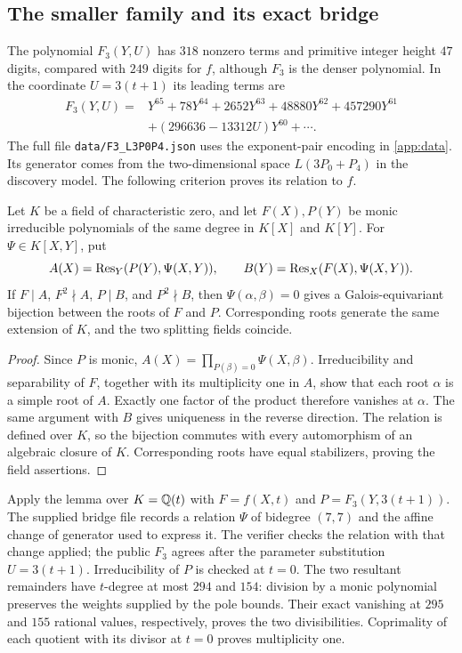 \subsection{The smaller family and its exact bridge}\label{app:smaller}

The polynomial $F_3(Y,U)$ has $318$ nonzero terms and primitive integer
height $47$ digits, compared with $249$ digits for $f$, although $F_3$ is
the denser polynomial. In the coordinate
$U=3(t+1)$ its leading terms are
\begin{equation}\label{eq:F3-leading}
\begin{split}
F_3(Y,U)={}&Y^{65}+78Y^{64}+2652Y^{63}+48880Y^{62}+457290Y^{61}\\
 &+(296636-13312U)Y^{60}+\cdots.
\end{split}
\end{equation}
The full file \texttt{data/F3\_L3P0P4.json} uses the exponent-pair encoding
in \cref{app:data}. Its generator comes from the two-dimensional space
$L(3P_0+P_4)$ in the discovery model. The following criterion proves its
relation to $f$.

\begin{lemma}\label{lem:bridge}
Let $K$ be a field of characteristic zero, and let $F(X),P(Y)$ be monic
irreducible polynomials of the same degree in $K[X]$ and $K[Y]$.
For $\Psi\in K[X,Y]$, put
\[
 A(X)=\operatorname{Res}_Y(P(Y),\Psi(X,Y)),\qquad
 B(Y)=\operatorname{Res}_X(F(X),\Psi(X,Y)).
\]
If $F\mid A$, $F^2\nmid A$, $P\mid B$, and $P^2\nmid B$, then
$\Psi(\alpha,\beta)=0$ gives a Galois-equivariant bijection between the
roots of $F$ and $P$. Corresponding roots generate the same extension of
$K$, and the two splitting fields coincide.
\end{lemma}
\begin{proof}
Since $P$ is monic, $A(X)=\prod_{P(\beta)=0}\Psi(X,\beta)$.
Irreducibility and separability of $F$, together with its multiplicity one
in $A$, show that each root $\alpha$ is a simple root of $A$. Exactly one
factor of the product therefore vanishes at $\alpha$. The same argument
with $B$ gives uniqueness in the reverse direction. The relation is
 defined over $K$, so the bijection commutes with every automorphism of an
algebraic closure of $K$. Corresponding roots have equal stabilizers,
proving the field assertions.
\end{proof}

Apply the lemma over $K=\mathbb{Q}(t)$ with $F=f(X,t)$ and
$P=F_3(Y,3(t+1))$. The supplied bridge file records a relation $\Psi$ of
bidegree $(7,7)$ and the affine change of generator used to express it.
The verifier checks the relation with that change applied; the public
$F_3$ agrees after the parameter substitution $U=3(t+1)$.
Irreducibility of $P$ is checked at $t=0$. The two resultant remainders
have $t$-degree at most $294$ and $154$: division by a monic polynomial
preserves the weights supplied by the pole bounds. Their exact vanishing
at $295$ and $155$ rational values, respectively, proves the two
divisibilities. Coprimality of each quotient with its divisor at $t=0$
proves multiplicity one.

